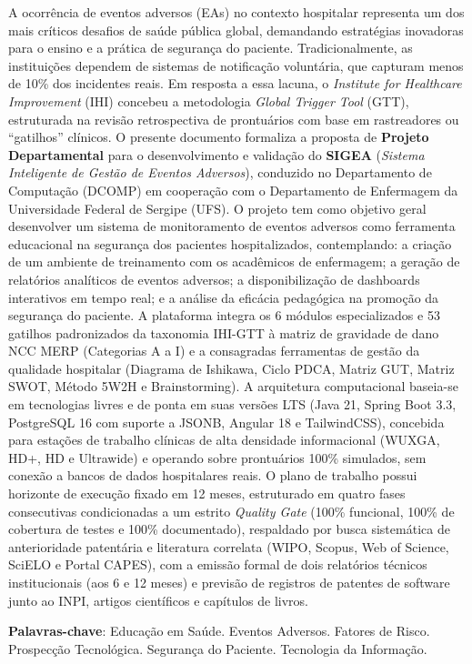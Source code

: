 \begin{resumo}
A ocorrência de eventos adversos (EAs) no contexto hospitalar representa um dos mais críticos desafios de saúde pública global, demandando estratégias inovadoras para o ensino e a prática de segurança do paciente. Tradicionalmente, as instituições dependem de sistemas de notificação voluntária, que capturam menos de 10\% dos incidentes reais. Em resposta a essa lacuna, o \textit{Institute for Healthcare Improvement} (IHI) concebeu a metodologia \textit{Global Trigger Tool} (GTT), estruturada na revisão retrospectiva de prontuários com base em rastreadores ou ``gatilhos'' clínicos. O presente documento formaliza a proposta de \textbf{Projeto Departamental} para o desenvolvimento e validação do \textbf{SIGEA} (\textit{Sistema Inteligente de Gestão de Eventos Adversos}), conduzido no Departamento de Computação (DCOMP) em cooperação com o Departamento de Enfermagem da Universidade Federal de Sergipe (UFS). O projeto tem como objetivo geral desenvolver um sistema de monitoramento de eventos adversos como ferramenta educacional na segurança dos pacientes hospitalizados, contemplando: a criação de um ambiente de treinamento com os acadêmicos de enfermagem; a geração de relatórios analíticos de eventos adversos; a disponibilização de dashboards interativos em tempo real; e a análise da eficácia pedagógica na promoção da segurança do paciente. A plataforma integra os 6 módulos especializados e 53 gatilhos padronizados da taxonomia IHI-GTT à matriz de gravidade de dano NCC MERP (Categorias A a I) e a consagradas ferramentas de gestão da qualidade hospitalar (Diagrama de Ishikawa, Ciclo PDCA, Matriz GUT, Matriz SWOT, Método 5W2H e Brainstorming). A arquitetura computacional baseia-se em tecnologias livres e de ponta em suas versões LTS (Java 21, Spring Boot 3.3, PostgreSQL 16 com suporte a JSONB, Angular 18 e TailwindCSS), concebida para estações de trabalho clínicas de alta densidade informacional (WUXGA, HD+, HD e Ultrawide) e operando sobre prontuários 100\% simulados, sem conexão a bancos de dados hospitalares reais. O plano de trabalho possui horizonte de execução fixado em 12 meses, estruturado em quatro fases consecutivas condicionadas a um estrito \textit{Quality Gate} (100\% funcional, 100\% de cobertura de testes e 100\% documentado), respaldado por busca sistemática de anterioridade patentária e literatura correlata (WIPO, Scopus, Web of Science, SciELO e Portal CAPES), com a emissão formal de dois relatórios técnicos institucionais (aos 6 e 12 meses) e previsão de registros de patentes de software junto ao INPI, artigos científicos e capítulos de livros.

\textbf{Palavras-chave}: Educação em Saúde. Eventos Adversos. Fatores de Risco. Prospecção Tecnológica. Segurança do Paciente. Tecnologia da Informação.
\end{resumo}
